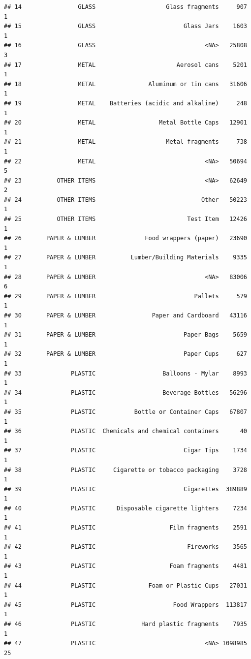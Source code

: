 \documentclass[10pt]{article}\usepackage[]{graphicx}\usepackage[]{color}
\makeatletter
\newenvironment{kframe}{%
 \def\at@end@of@kframe{}%
 \ifinner\ifhmode%
  \def\at@end@of@kframe{\end{minipage}}%
  \begin{minipage}{\columnwidth}%
 \fi\fi%
 \def\FrameCommand##1{\hskip\@totalleftmargin \hskip-\fboxsep
 \colorbox{shadecolor}{##1}\hskip-\fboxsep
     \hskip-\linewidth \hskip-\@totalleftmargin \hskip\columnwidth}%
 \MakeFramed {\advance\hsize-\width
   \@totalleftmargin\z@ \linewidth\hsize
   \@setminipage}}%
 {\par\unskip\endMakeFramed%
 \at@end@of@kframe}
\newenvironment{knitrout}{}{} %
\makeatother
\begin{document}
\begin{itemize}
\begin{knitrout}
\begin{kframe}
\begin{verbatim}
## 14                GLASS                    Glass fragments     907      1
## 15                GLASS                         Glass Jars    1603      1
## 16                GLASS                               <NA>   25808      3
## 17                METAL                       Aerosol cans    5201      1
## 18                METAL               Aluminum or tin cans   31606      1
## 19                METAL    Batteries (acidic and alkaline)     248      1
## 20                METAL                  Metal Bottle Caps   12901      1
## 21                METAL                    Metal fragments     738      1
## 22                METAL                               <NA>   50694      5
## 23          OTHER ITEMS                               <NA>   62649      2
## 24          OTHER ITEMS                              Other   50223      1
## 25          OTHER ITEMS                          Test Item   12426      1
## 26       PAPER & LUMBER              Food wrappers (paper)   23690      1
## 27       PAPER & LUMBER          Lumber/Building Materials    9335      1
## 28       PAPER & LUMBER                               <NA>   83006      6
## 29       PAPER & LUMBER                            Pallets     579      1
## 30       PAPER & LUMBER                Paper and Cardboard   43116      1
## 31       PAPER & LUMBER                         Paper Bags    5659      1
## 32       PAPER & LUMBER                         Paper Cups     627      1
## 33              PLASTIC                   Balloons - Mylar    8993      1
## 34              PLASTIC                   Beverage Bottles   56296      1
## 35              PLASTIC           Bottle or Container Caps   67807      1
## 36              PLASTIC  Chemicals and chemical containers      40      1
## 37              PLASTIC                         Cigar Tips    1734      1
## 38              PLASTIC     Cigarette or tobacco packaging    3728      1
## 39              PLASTIC                         Cigarettes  389889      1
## 40              PLASTIC      Disposable cigarette lighters    7234      1
## 41              PLASTIC                     Film fragments    2591      1
## 42              PLASTIC                          Fireworks    3565      1
## 43              PLASTIC                     Foam fragments    4481      1
## 44              PLASTIC               Foam or Plastic Cups   27031      1
## 45              PLASTIC                      Food Wrappers  113817      1
## 46              PLASTIC             Hard plastic fragments    7935      1
## 47              PLASTIC                               <NA> 1098985     25

\end{verbatim}
\end{kframe}
\end{knitrout}
\end{itemize}
\end{document}
